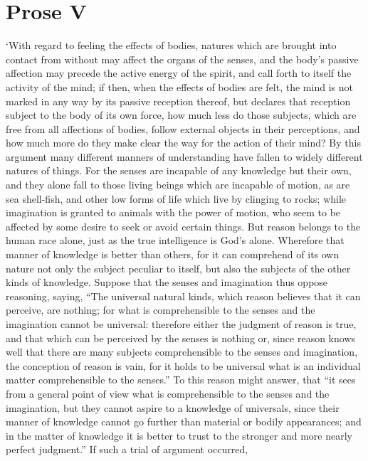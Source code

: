 \section*{Prose V}

`With regard to feeling the effects of bodies, natures which are
brought into contact from without may affect the organs of the senses,
and the body's passive affection may precede the active energy of the
spirit, and call forth to itself the activity of the mind; if then,
when the effects of bodies are felt, the mind is not marked in any way
by its passive reception thereof, but declares that reception subject
to the body of its own force, how much less do those subjects, which
are free from all affections of bodies, follow external objects in
their perceptions, and how much more do they make clear the way for
the action of their mind? By this argument many different manners of
understanding have fallen to widely different natures of things. For
the senses are incapable of any knowledge but their own, and they
alone fall to those living beings which are incapable of motion, as
are sea shell-fish, and other low forms of life which live by clinging
to rocks; while imagination is granted to animals with the power of
motion, who seem to be affected by some desire to seek or avoid
certain things.  But reason belongs to the human race alone,
just as the true intelligence is God's alone. Wherefore that manner of
knowledge is better than others, for it can comprehend of its own
nature not only the subject peculiar to itself, but also the subjects
of the other kinds of knowledge. Suppose that the senses and
imagination thus oppose reasoning, saying, ``The universal natural
kinds, which reason believes that it can perceive, are nothing; for
what is comprehensible to the senses and the imagination cannot be
universal: therefore either the judgment of reason is true, and that
which can be perceived by the senses is nothing or, since reason knows
well that there are many subjects comprehensible to the senses and
imagination, the conception of reason is vain, for it holds to be
universal what is an individual matter comprehensible to the senses.''
To this reason might answer, that ``it sees from a general point of
view what is comprehensible to the senses and the imagination, but
they cannot aspire to a knowledge of universals, since their manner of
knowledge cannot go further than material or bodily appearances; and
in the matter of knowledge it is better to trust to the stronger and
more nearly perfect judgment.'' If such a trial of argument occurred,
